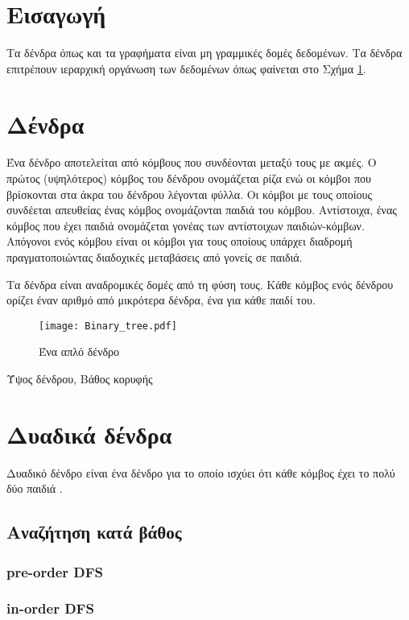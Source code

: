 \section{Εισαγωγή}
Τα δένδρα όπως και τα γραφήματα είναι μη γραμμικές δομές δεδομένων. Τα δένδρα επιτρέπουν ιεραρχική οργάνωση των δεδομένων όπως φαίνεται στο Σχήμα \ref{fig:binary_tree}. 

\section{Δένδρα}

Ένα δένδρο αποτελείται από κόμβους που συνδέονται μεταξύ τους με ακμές. Ο πρώτος (υψηλότερος) κόμβος του δένδρου ονομάζεται ρίζα ενώ οι κόμβοι που βρίσκονται στα άκρα του δένδρου λέγονται φύλλα. Οι κόμβοι με τους οποίους συνδέεται απευθείας ένας κόμβος ονομάζονται παιδιά του κόμβου. Αντίστοιχα, ένας κόμβος που έχει παιδιά ονομάζεται γονέας των αντίστοιχων παιδιών-κόμβων. Απόγονοι ενός κόμβου είναι οι κόμβοι για τους οποίους υπάρχει διαδρομή πραγματοποιώντας διαδοχικές μεταβάσεις από γονείς σε παιδιά. 

Τα δένδρα είναι αναδρομικές δομές από τη φύση τους. Κάθε κόμβος ενός δένδρου ορίζει έναν αριθμό από μικρότερα δένδρα, ένα για κάθε παιδί του.
 
\begin{figure}[htbp]
  \centering
  \texttt{[image: Binary\_tree.pdf]}
  \caption{Ένα απλό δένδρο \cite{wikipedia_binary_tree}}
  \label{fig:binary_tree}
\end{figure}

Ύψος δένδρου, Βάθος κορυφής

\section{Δυαδικά δένδρα}

Δυαδικό δένδρο είναι ένα δένδρο για το οποίο ισχύει ότι κάθε κόμβος έχει το πολύ δύο παιδιά \cite{parlante_binary_tree}.

\subsection{Αναζήτηση κατά βάθος}
\subsubsection{pre-order DFS}
\subsubsection{in-order DFS}
